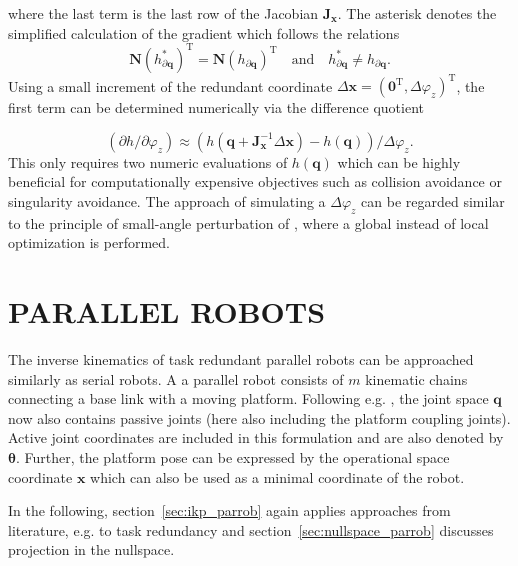 \documentclass[a4paper,twoside]{article}
\newcommand{\transp}[0]{{\mathrm{T}}}
\begin{document}
where the last term is the last row of the Jacobian $\bm{J}_{\bm{x}}$.
The asterisk denotes the simplified calculation of the gradient which follows the relations
\begin{equation}
\bm{N} (h_{\partial \bm{q}}^{*})^\transp = \bm{N} (h_{\partial \bm{q}})^\transp
\quad\mathrm{and}\quad
h_{\partial \bm{q}}^{*} \neq h_{\partial \bm{q}}.
\label{eq:serrob_nullspaceproj_equivalence}
\end{equation}
Using a small increment of the redundant coordinate $\Delta \bm{x}=(\bm{0}^\transp,\Delta  \varphi_z)^\transp$, the first term can be determined numerically via the difference quotient

\begin{equation}
(\partial h / \partial \varphi_z) \approx (h(\bm{q}+\bm{J}_{\bm{x}}^{-1}\Delta \bm{x}) - h(\bm{q}))/\Delta \varphi_z.
\label{eq:serrob_nullspace_h_phiz}
\end{equation}
This only requires two numeric evaluations of $h(\bm{q})$ which can be highly beneficial for computationally expensive objectives such as collision avoidance or singularity avoidance.
The approach of simulating a $\Delta \varphi_z$ can be regarded similar to the principle of small-angle perturbation of \cite{GaoCheGaoXia2019}, where a global instead of local optimization is performed.


\section{\uppercase{Parallel Robots}}
\label{sec:parrob}

The inverse kinematics of task redundant parallel robots can be approached similarly as serial robots.
A a parallel robot consists of $m$ kinematic chains connecting a base link with a moving platform.
Following e.g. \cite{Merlet2006a}, the joint space $\bm{q}$ now also contains passive joints (here also including the platform coupling joints).
Active joint coordinates are included in this formulation and are also denoted by $\bm{\theta}$.
Further, the platform pose can be expressed by the operational space coordinate $\bm{x}$ which can also be used as a minimal coordinate of the robot.

In the following, section~\ref{sec:ikp_parrob} again applies approaches from literature, e.g. \cite{Merlet2006a,ChiaveriniOriWal2008} to task redundancy and section~\ref{sec:nullspace_parrob} discusses projection in the nullspace.
\end{document}
